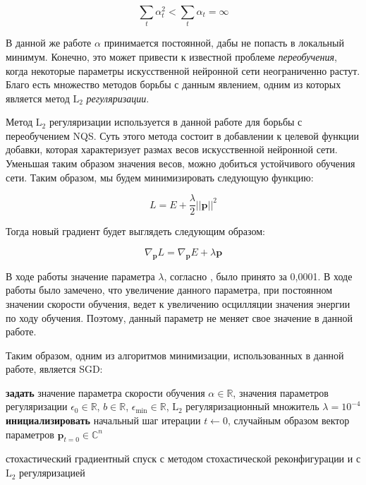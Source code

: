 \[
\sum_{t}\alpha_t^2<\sum_{t}\alpha_t=\infty
\]

В данной же работе  $\alpha$ принимается постоянной, дабы не попасть в локальный минимум. 
Конечно, это может привести к известной проблеме \textit{переобучения}, когда некоторые параметры искусственной нейронной сети неограниченно растут. 
Благо есть множество методов борьбы с данным явлением, одним из которых является метод $\text{L}_2$ \textit{регуляризации}.

Метод $\text{L}_2$ регуляризации используется в данной работе для борьбы с переобучением NQS. 
Суть этого метода состоит в добавлении к целевой функции добавки, которая характеризует размах весов искусственной нейронной сети.
Уменьшая таким образом значения весов, можно добиться устойчивого обучения сети.
Таким образом, мы будем минимизировать следующую функцию:

\begin{equation}
L = E + \frac{\lambda}{2}||\mathbf{p}||^2
\end{equation}

Тогда новый градиент будет выглядеть следующим образом:

\begin{equation}
\nabla_{\mathbf{p}}L = \nabla_{\mathbf{p}}E + \lambda\mathbf{p}
\end{equation}

В ходе работы значение параметра $\lambda$, согласно \cite{hinton2012practical}, было принято за 0,0001. 
В ходе работы было замечено, что увеличение данного параметра, при постоянном значении скорости обучения, ведет к увеличению осцилляции значения энергии по ходу обучения.
Поэтому, данный параметр не меняет свое значение в данной работе.

Таким образом, одним из алгоритмов минимизации, использованных в данной работе, является SGD:

\begin{algorithm}[H]
    \renewcommand{\algorithmcfname}{SGD}
    \textbf{задать} значение параметра скорости обучения $\alpha\in\mathbb{R}$, значения параметров регуляризации $\epsilon_0\in\mathbb{R}$, $b\in\mathbb{R}$, $\epsilon_{\min}\in\mathbb{R}$,  $\text{L}_2$ регуляризационный множитель $\lambda=10^{-4}$\\
    \textbf{инициализировать} начальный шаг итерации $t \leftarrow 0$, случайным образом вектор параметров $\mathbf{p}_{t=0}\in\mathbb{C}^n$\\
    \caption{стохастический градиентный спуск с методом стохастической реконфигурации и с $\text{L}_2$ регуляризацией}
\end{algorithm}

